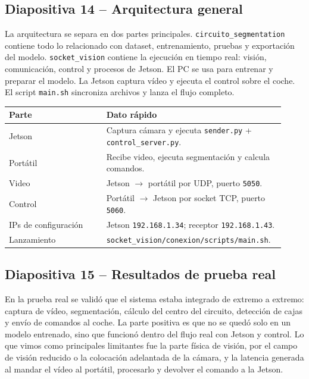 \documentclass[a4paper,11pt]{article}
\begin{document}
\subsection*{Diapositiva 14 -- Arquitectura general}
La arquitectura se separa en dos partes principales. \texttt{circuito\_segmentation} contiene todo lo relacionado con dataset, entrenamiento, pruebas y exportaci\'on del modelo. \texttt{socket\_vision} contiene la ejecuci\'on en tiempo real: visi\'on, comunicaci\'on, control y procesos de Jetson. El PC se usa para entrenar y preparar el modelo. La Jetson captura v\'ideo y ejecuta el control sobre el coche. El script \texttt{main.sh} sincroniza archivos y lanza el flujo completo.

\begin{center}
\centering
\footnotesize
\begin{tabular}{@{}L{0.34\linewidth}L{0.58\linewidth}@{}}
\toprule
\textbf{Parte} & \textbf{Dato r\'apido} \\
\midrule
Jetson & Captura c\'amara y ejecuta \texttt{sender.py} + \texttt{control\_server.py}. \\
Port\'atil & Recibe video, ejecuta segmentaci\'on y calcula comandos. \\
Video & Jetson $\rightarrow$ port\'atil por UDP, puerto \texttt{5050}. \\
Control & Port\'atil $\rightarrow$ Jetson por socket TCP, puerto \texttt{5060}. \\
IPs de configuraci\'on & Jetson \texttt{192.168.1.34}; receptor \texttt{192.168.1.43}. \\
Lanzamiento & \texttt{socket\_vision/conexion/scripts/main.sh}. \\
\bottomrule
\end{tabular}
\end{center}

\subsection*{Diapositiva 15 -- Resultados de prueba real}
En la prueba real se valid\'o que el sistema estaba integrado de extremo a extremo: captura de v\'ideo, segmentaci\'on, c\'alculo del centro del circuito, detecci\'on de cajas y env\'io de comandos al coche. La parte positiva es que no se qued\'o solo en un modelo entrenado, sino que funcion\'o dentro del flujo real con Jetson y control. Lo que vimos como principales limitantes fue la parte f\'isica de visi\'on, por el campo de visi\'on reducido o la colocaci\'on adelantada de la c\'amara, y la latencia generada al mandar el v\'ideo al port\'atil, procesarlo y devolver el comando a la Jetson.
\end{document}
